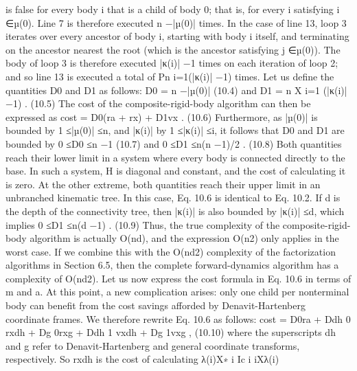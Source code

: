 is false for every body i that is a child of body 0; that is, for every i satisfying i ∈µ(0). Line 7 is therefore executed n −|µ(0)| times. In the case of line 13, loop 3 iterates over every ancestor of body i, starting with body i itself, and terminating on the ancestor nearest the root (which is the ancestor satisfying j ∈µ(0)). The body of loop 3 is therefore executed |κ(i)| −1 times on each iteration of loop 2; and so line 13 is executed a total of Pn i=1(|κ(i)| −1) times. Let us define the quantities D0 and D1 as follows: D0 = n −|µ(0)| (10.4) and D1 = n X i=1 (|κ(i)| −1) . (10.5) The cost of the composite-rigid-body algorithm can then be expressed as cost = D0(ra + rx) + D1vx . (10.6) Furthermore, as |µ(0)| is bounded by 1 ≤|µ(0)| ≤n, and |κ(i)| by 1 ≤|κ(i)| ≤i, it follows that D0 and D1 are bounded by 0 ≤D0 ≤n −1 (10.7) and 0 ≤D1 ≤n(n −1)/2 . (10.8) Both quantities reach their lower limit in a system where every body is connected directly to the base. In such a system, H is diagonal and constant, and the cost of calculating it is zero. At the other extreme, both quantities reach their upper limit in an unbranched kinematic tree. In this case, Eq. 10.6 is identical to Eq. 10.2. If d is the depth of the connectivity tree, then |κ(i)| is also bounded by |κ(i)| ≤d, which implies 0 ≤D1 ≤n(d −1) . (10.9) Thus, the true complexity of the composite-rigid-body algorithm is actually O(nd), and the expression O(n2) only applies in the worst case. If we combine this with the O(nd2) complexity of the factorization algorithms in Section 6.5, then the complete forward-dynamics algorithm has a complexity of O(nd2). Let us now express the cost formula in Eq. 10.6 in terms of m and a. At this point, a new complication arises: only one child per nonterminal body can benefit from the cost savings afforded by Denavit-Hartenberg coordinate frames. We therefore rewrite Eq. 10.6 as follows: cost = D0ra + Ddh 0 rxdh + Dg 0rxg + Ddh 1 vxdh + Dg 1vxg , (10.10) where the superscripts dh and g refer to Denavit-Hartenberg and general coordinate transforms, respectively. So rxdh is the cost of calculating λ(i)X∗ i Ic i iXλ(i)

